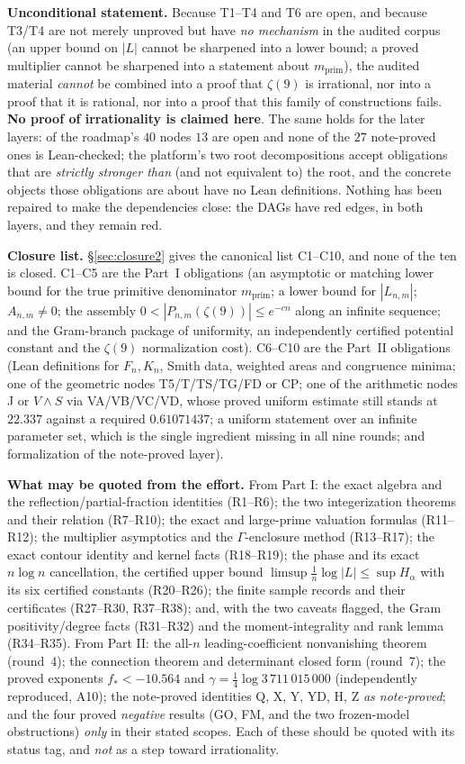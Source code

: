 \documentclass[11pt]{article}
\begin{document}
\textbf{Unconditional statement.} Because T1--T4 and T6 are open, and because T3/T4 are not merely
unproved but have \emph{no mechanism} in the audited corpus (an upper bound on $|L|$ cannot be
sharpened into a lower bound; a proved multiplier cannot be sharpened into a statement about
$m_{\mathrm{prim}}$), the audited material \emph{cannot} be combined into a proof that $\zeta(9)$ is
irrational, nor into a proof that it is rational, nor into a proof that this family of constructions
fails. \textbf{No proof of irrationality is claimed here}. The same holds for the later layers: of
the roadmap's $40$ nodes $13$ are open and none of the $27$ note-proved ones is Lean-checked; the
platform's two root decompositions accept obligations that are \emph{strictly stronger than} (and not
equivalent to) the root, and the concrete objects those obligations are about have no Lean
definitions. Nothing has been repaired to make the dependencies close: the DAGs have red edges, in
both layers, and they remain red.

\textbf{Closure list.} \S\ref{sec:closure2} gives the canonical list C1--C10, and none of the ten is
closed. C1--C5 are the Part~I obligations (an asymptotic or matching lower bound for the true
primitive denominator $m_{\mathrm{prim}}$; a lower bound for $|L_{n,m}|$; $A_{n,m}\ne0$; the assembly
$0<|P_{n,m}(\zeta(9))|\le e^{-cn}$ along an infinite sequence; and the Gram-branch package of
uniformity, an independently certified potential constant and the $\zeta(9)$ normalization cost).
C6--C10 are the Part~II obligations (Lean definitions for $F_n,K_n$, Smith data, weighted areas and
congruence minima; one of the geometric nodes T5/T/TS/TG/FD or CP; one of the arithmetic nodes J or
$V\wedge S$ via VA/VB/VC/VD, whose proved uniform estimate still stands at $22.337$ against a required
$0.61071437$; a uniform statement over an infinite parameter set, which is the single ingredient
missing in all nine rounds; and formalization of the note-proved layer).

\textbf{What may be quoted from the effort.} From Part I: the exact algebra and the
reflection/partial-fraction identities (R1--R6); the two integerization theorems and their relation
(R7--R10); the exact and large-prime valuation formulas (R11--R12); the multiplier asymptotics and the
$\Gamma$-enclosure method (R13--R17); the exact contour identity and kernel facts (R18--R19); the
phase and its exact $n\log n$ cancellation, the certified upper bound
$\limsup\frac1n\log|L|\le\sup H_\alpha$ with its six certified constants (R20--R26); the finite
sample records and their certificates (R27--R30, R37--R38); and, with the two caveats flagged, the
Gram positivity/degree facts (R31--R32) and the moment-integrality and rank lemma (R34--R35). From
Part II: the all-$n$ leading-coefficient nonvanishing theorem (round~4); the connection theorem and
determinant closed form (round~7); the proved exponents $f_*<-10.564$ and $\gamma=\frac14\log
3\,711\,015\,000$ (independently reproduced, A10); the note-proved identities Q, X, Y, YD, H, Z
\emph{as note-proved}; and the four proved \emph{negative} results (GO, FM, and the two frozen-model
obstructions) \emph{only} in their stated scopes. Each of these should be quoted with its status tag,
and \emph{not} as a step toward irrationality.
\end{document}
